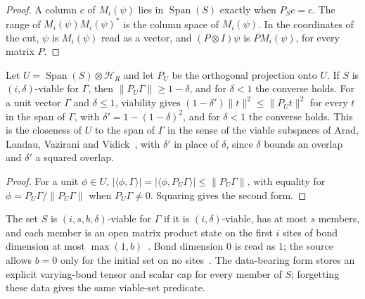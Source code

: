 \begin{proof}
    \leanok
    A column $c$ of $M_i(\psi)$ lies in $\operatorname{Span}(S)$ exactly when
    $P_Sc=c$. The range of $M_i(\psi)M_i(\psi)^*$ is the column space of
    $M_i(\psi)$. In the coordinates of the cut, $\psi$ is $M_i(\psi)$ read as a
    vector, and $(P\otimes I)\psi$ is $PM_i(\psi)$, for every matrix $P$.
\end{proof}

\begin{lemma}
    \label{thm:lvv_viable_closeness}
    \leanok
    Let $U=\operatorname{Span}(S)\otimes\mathcal H_R$ and let $P_U$ be the
    orthogonal projection onto $U$. If $S$ is $(i,\delta)$-viable for $\Gamma$,
    then $\|P_U\Gamma\|\ge1-\delta$, and for $\delta<1$ the converse holds. For a
    unit vector $\Gamma$ and $\delta\le1$, viability gives
    $(1-\delta')\|t\|^2\le\|P_Ut\|^2$ for every $t$ in the span of $\Gamma$, with
    $\delta'=1-(1-\delta)^2$, and for $\delta<1$ the converse holds. This is the
    closeness of $U$ to the span of $\Gamma$ in the sense of the viable subspaces
    of Arad, Landau, Vazirani and
    Vidick~\cite[lines 433--440]{Arad2016RigorousRG}, with $\delta'$ in place of
    $\delta$, since $\delta$ bounds an overlap and $\delta'$ a squared overlap.
\end{lemma}

\begin{proof}
    \leanok
    For a unit $\phi\in U$, $|\langle\phi,\Gamma\rangle|
        =|\langle\phi,P_U\Gamma\rangle|\le\|P_U\Gamma\|$, with equality for
    $\phi=P_U\Gamma/\|P_U\Gamma\|$ when $P_U\Gamma\ne0$. Squaring gives the second
    form.
\end{proof}

\begin{definition}
    \label{def:lvv_viable_mps}
    \leanok
    The set $S$ is $(i,s,b,\delta)$-viable for $\Gamma$ if it is
    $(i,\delta)$-viable, has at most $s$ members, and each member is an open
    matrix product state on the first $i$ sites of bond dimension at most
    $\max(1,b)$~\cite[line 243]{Landau2015Polynomial}. Bond dimension $0$ is read
    as $1$; the source allows $b=0$ only for the initial set on no
    sites~\cite{gap:lvv13_bond_dimension_zero}.
    The data-bearing form stores an explicit varying-bond tensor and scalar
    cap for every member of $S$; forgetting these data gives the same viable-set
    predicate.
\end{definition}

